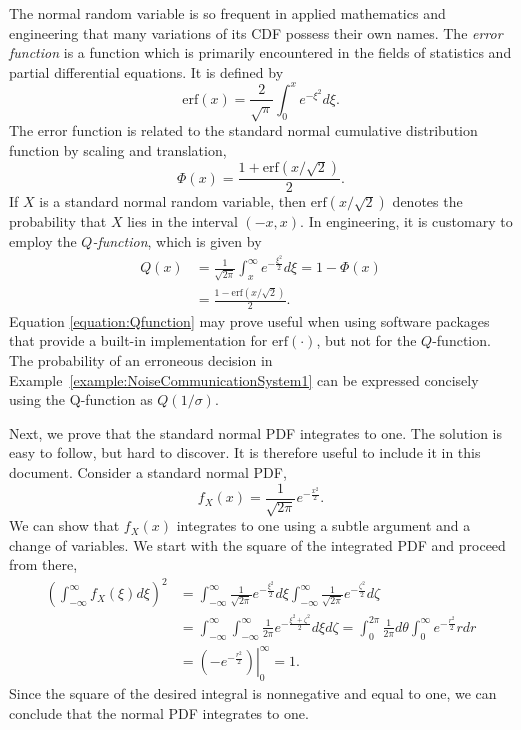 The normal random variable is so frequent in applied mathematics and engineering that many variations of its CDF possess their own names.
The \emph{error function} is a function which is primarily encountered in the fields of statistics and partial differential equations. 
It is defined by
\begin{equation*}
\mathrm{erf} (x) = \frac{2}{\sqrt{\pi}} \int_0^x e^{-\xi^2} d\xi .
\end{equation*}
The error function is related to the standard normal cumulative distribution function by scaling and translation,
\begin{equation*}
\Phi (x) = \frac{1 + \mathrm{erf} \left( {x}/{\sqrt{2}} \right)}{2}.
\end{equation*}
If $X$ is a standard normal random variable, then $\mathrm{erf} \left( x/{\sqrt{2}} \right)$ denotes the probability that $X$ lies in the interval $(-x, x)$.
In engineering, it is customary to employ the \emph{$Q$-function}, which is given by 
\begin{equation} \label{equation:Qfunction}
\begin{split}
Q (x) &= \frac{1}{\sqrt{2 \pi}} \int_x^{\infty} e^{-\frac{\xi^2}{2}} d\xi
= 1 - \Phi (x) \\
&= \frac{ 1 - \mathrm{erf} \left( {x}/{\sqrt{2}} \right) }{2} .
\end{split}
\end{equation}
Equation \eqref{equation:Qfunction} may prove useful when using software packages that provide a built-in implementation for $\mathrm{erf}(\cdot)$, but not for the $Q$-function.
The probability of an erroneous decision in Example~\ref{example:NoiseCommunicationSystem1} can be expressed concisely using the Q-function as $Q (1/\sigma)$.


Next, we prove that the standard normal PDF integrates to one.
The solution is easy to follow, but hard to discover.
It is therefore useful to include it in this document.
Consider a standard normal PDF,
\begin{equation*}
f_X(x) = \frac{1}{\sqrt{2 \pi}} e^{- \frac{x^2}{2}} .
\end{equation*}
We can show that $f_X (x)$ integrates to one using a subtle argument and a change of variables.
We start with the square of the integrated PDF and proceed from there,
\begin{equation*}
\begin{split}
\left(\int_{- \infty}^{\infty} f_X (\xi) d\xi \right)^2
&= \int_{- \infty}^{\infty} \frac{1}{\sqrt{2 \pi}} e^{- \frac{\xi^2}{2}} d\xi
\int_{- \infty}^{\infty} \frac{1}{\sqrt{2 \pi}} e^{- \frac{\zeta^2}{2}} d\zeta \\
&= \int_{- \infty}^{\infty} \int_{- \infty}^{\infty}
\frac{1}{2 \pi} e^{- \frac{\xi^2 + \zeta^2}{2}} d\xi d\zeta
= \int_{0}^{2 \pi} \frac{1}{2 \pi} d\theta
\int_{0}^{\infty} e^{- \frac{r^2}{2}} r dr \\
&= \left. \left( - e^{- \frac{r^2}{2}} \right) \right|_0^{\infty} = 1.
\end{split}
\end{equation*}
Since the square of the desired integral is nonnegative and equal to one, we can conclude that the normal PDF integrates to one.

